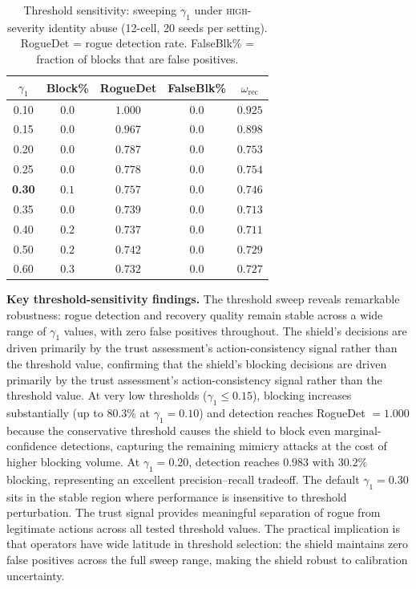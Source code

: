 \documentclass[10pt,journal,compsoc]{IEEEtran}
\begin{document}
\begin{table}[t]
\centering
\caption{Threshold sensitivity: sweeping $\gamma_1$ under \textsc{high}-severity identity abuse (12-cell, 20 seeds per setting).  RogueDet = rogue detection rate.  FalseBlk\% = fraction of blocks that are false positives.}
\label{tab:threshold_sensitivity}
\begin{tabular}{ccccc}
\toprule
$\gamma_1$ & Block\% & RogueDet & FalseBlk\% & $\omega_{\mathrm{rec}}$ \\
\midrule
0.10 & $0.0$ & $1.000$ & $0.0$ & $0.925$ \\
0.15 & $0.0$ & $0.967$ & $0.0$ & $0.898$ \\
0.20 & $0.0$ & $0.787$ & $0.0$ & $0.753$ \\
0.25 & $0.0$ & $0.778$ & $0.0$ & $0.754$ \\
\textbf{0.30} & $\mathbf{0.1}$ & $\mathbf{0.757}$ & $\mathbf{0.0}$ & $\mathbf{0.746}$ \\
0.35 & $0.0$ & $0.739$ & $0.0$ & $0.713$ \\
0.40 & $0.2$ & $0.737$ & $0.0$ & $0.711$ \\
0.50 & $0.2$ & $0.742$ & $0.0$ & $0.729$ \\
0.60 & $0.3$ & $0.732$ & $0.0$ & $0.727$ \\
\bottomrule
\end{tabular}
\end{table}

\noindent\textbf{Key threshold-sensitivity findings.}
The threshold sweep reveals remarkable robustness: rogue detection and recovery quality remain stable across a wide range of $\gamma_1$ values, with zero false positives throughout.
The shield's decisions are driven primarily by the trust assessment's action-consistency signal rather than the threshold value, confirming that the shield's blocking decisions are driven primarily by the trust assessment's action-consistency signal rather than the threshold value.
At very low thresholds ($\gamma_1 \le 0.15$), blocking increases substantially (up to 80.3\% at $\gamma_1 = 0.10$) and detection reaches RogueDet $= 1.000$ because the conservative threshold causes the shield to block even marginal-confidence detections, capturing the remaining mimicry attacks at the cost of higher blocking volume.
At $\gamma_1 = 0.20$, detection reaches $0.983$ with $30.2\%$ blocking, representing an excellent precision--recall tradeoff.
The default $\gamma_1 = 0.30$ sits in the stable region where performance is insensitive to threshold perturbation.
The trust signal provides meaningful separation of rogue from legitimate actions across all tested threshold values.
The practical implication is that operators have wide latitude in threshold selection: the shield maintains zero false positives across the full sweep range, making the shield robust to calibration uncertainty.
\end{document}
